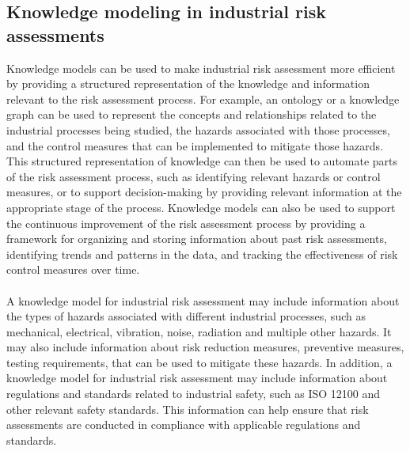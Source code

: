  \subsection{Knowledge modeling in industrial risk assessments} \label{km_in_ira}
 Knowledge models can be used to make industrial risk assessment more efficient by providing a structured representation of the knowledge and information relevant to the risk assessment process. For example, an ontology or a knowledge graph can be used to represent the concepts and relationships related to the industrial processes being studied, the hazards associated with those processes, and the control measures that can be implemented to mitigate those hazards. This structured representation of knowledge can then be used to automate parts of the risk assessment process, such as identifying relevant hazards or control measures, or to support decision-making by providing relevant information at the appropriate stage of the process. Knowledge models can also be used to support the continuous improvement of the risk assessment process by providing a framework for organizing and storing information about past risk assessments, identifying trends and patterns in the data, and tracking the effectiveness of risk control measures over time.
 
 \paragraph{} A knowledge model for industrial risk assessment may include information about the types of hazards associated with different industrial processes, such as mechanical, electrical, vibration, noise, radiation and multiple other hazards. It may also include information about risk reduction measures, preventive measures, testing requirements, that can be used to mitigate these hazards. In addition, a knowledge model for industrial risk assessment may include information about regulations and standards related to industrial safety, such as ISO 12100 and other relevant safety standards. This information can help ensure that risk assessments are conducted in compliance with applicable regulations and standards. 